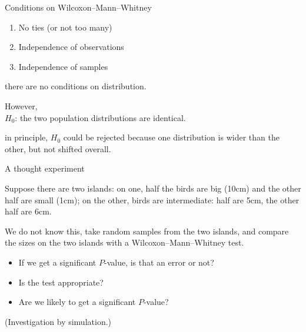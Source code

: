 \begin{frame}{Conditions on Wilcoxon--Mann--Whitney}

  \begin{enumerate}
    \item No ties (or not too many)
    \item Independence of observations
    \item Independence of samples
  \end{enumerate}

    \vspace{2em}

     there are no conditions on distribution.

    \vspace{2em}
   \alert{However,}\\
    $H_0$: the two population distributions are identical.


    \vspace{2em}

     in principle, $H_0$ could be rejected because one distribution is wider than the other, but not shifted overall.

\end{frame}


\begin{frame}{A thought experiment}

  Suppose there are two islands: 
  on one, half the birds are big (10cm) and the other half are small (1cm);
  on the other, birds are intermediate: half are 5cm, the other half are 6cm.

  \vspace{2em}

  We do not know this, take random samples from the two islands,
  and compare the sizes on the two islands with a Wilcoxon--Mann--Whitney test.
  \begin{itemize}
    \item If we get a significant $P$-value, is that an error or not?
    \item Is the test appropriate?
    \item Are we likely to get a significant $P$-value?
  \end{itemize}

  \vspace{2em}
  \pause

  (Investigation by simulation.)

\end{frame}

